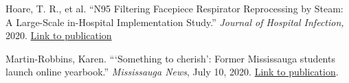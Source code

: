 \documentclass[a4paper,10pt]{article}
\begin{document}
Hoare, T. R., et al. “N95 Filtering Facepiece Respirator Reprocessing by Steam: A Large-Scale in-Hospital Implementation Study.” \textit{Journal of Hospital Infection, }2020. \href{https://www.sciencedirect.com/science/article/pii/S0195670120304576#!}{Link to publication}

\vspace{8pt}


Martin-Robbins, Karen. “‘Something to cherish’: Former Mississauga students launch online yearbook.” \textit{Mississauga News}, July 10, 2020. \href{https://www.mississauga.com/community-story/10071561--something-to-cherish-former-mississauga-students-launch-online-yearbook/}{Link to publication}.


\vfill
{}
\end{document}
